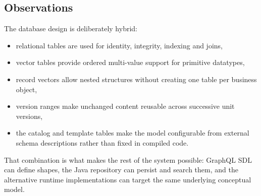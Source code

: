 \subsection{Observations}

The database design is deliberately hybrid:
\begin{itemize}
\item relational tables are used for identity, integrity, indexing and joins,
\item vector tables provide ordered multi-value support for primitive datatypes,
\item record vectors allow nested structures without creating one table per business object,
\item version ranges make unchanged content reusable across successive unit versions,
\item the catalog and template tables make the model configurable from external schema descriptions rather than fixed in compiled code.
\end{itemize}

That combination is what makes the rest of the system possible: GraphQL SDL can define shapes, the Java repository can persist and search them, and the alternative runtime implementations can target the same underlying conceptual model.
